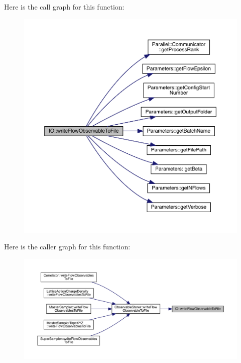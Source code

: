 Here is the call graph for this function\+:\nopagebreak
\begin{figure}[H]
\begin{center}
\leavevmode
\includegraphics[width=350pt]{namespace_i_o_a4f554804fd2ccd9c13c73777c5cbbf77_cgraph}
\end{center}
\end{figure}
Here is the caller graph for this function\+:\nopagebreak
\begin{figure}[H]
\begin{center}
\leavevmode
\includegraphics[width=350pt]{namespace_i_o_a4f554804fd2ccd9c13c73777c5cbbf77_icgraph}
\end{center}
\end{figure}
\mbox{\label{namespace_i_o_ad77b7dd770afc8e2eb433d6187ea3616}} 
